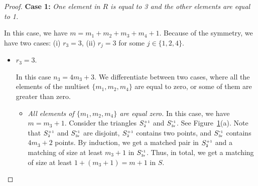 \documentclass[11pt,a4paper]{article}
\newcommand{\SP}[2]{S^{\text{\tiny +#1}}_\text{\tiny #2}}
\newcommand{\SM}[2]{S^{\text{-\tiny #1}}_\text{\tiny #2}}
\begin{document}
\begin{proof}
{\bf Case 1:} {\em One element in $R$ is equal to 3 and the other elements are equal to 1.}

In this case, we have $m=m_1+m_2+m_3+m_4+1$. Because of the symmetry, we have two cases: (i) $r_3=3$, (ii) $r_j=3$ for some $j\in\{1,2,4\}$.

\begin{itemize}
 
\begin{figure}[h!]
  \centering
\setlength{\tabcolsep}{0in}
  $\begin{tabular}{cc}
\multicolumn{1}{m{.5\columnwidth}}{\centering\texttt{[image: fig/strong1005-1-a.pdf]}}
&\multicolumn{1}{m{.5\columnwidth}}{\centering\texttt{[image: fig/strong1005-1-b.pdf]}} \\
(a) & (b)
\end{tabular}$
  \caption{(a) Split $S$ into four equal area triangles. (b) $\SM{3}{2}$ is larger than $\SM{3}{1}$ and $\SM{3}{4}$.}
\label{Theta-six-fig}
\end{figure}

 \item {$r_3=3$.}

In this case $n_3=4m_3+3$. We differentiate between two cases, where all the elements of the multiset $\{m_1, m_2, m_4\}$ are equal to zero, or some of them are greater than zero.

\begin{itemize}
 \item {\em All elements of $\{m_1, m_2, m_4\}$ are equal zero.} In this case, we have $m=m_3+1$. Consider the triangles $\SP{1}{2}$ and $\SM{1}{3r}$. See Figure~\ref{Theta-six-fig}(a). Note that $\SP{1}{2}$ and $\SM{1}{3r}$ are disjoint, $\SP{1}{2}$ contains two points, and $\SM{1}{3r}$ contains $4m_3+2$ points. By induction, we get a matched pair in $\SP{1}{2}$ and a matching of size at least $m_3+1$ in $\SM{1}{3r}$. Thus, in total, we get a matching of size at least $1+(m_3+1)=m+1$ in $S$.


\end{itemize}
\end{itemize}
\end{proof}
\end{document}

